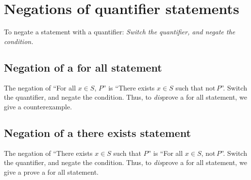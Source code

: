 \documentclass[12pt]{amsart}
\begin{document}
\section*{Negations of quantifier statements} To negate a statement with a quantifier: \emph{Switch the quantifier, and negate the condition.}

\subsection*{Negation of a for all statement} The negation of ``For all $x\in S$, $P$'' is ``There exists $x\in S$ such that $\mathrm{not} \, P$''.  Switch the quantifier, and negate the condition. Thus, to \emph{dis}prove a for all statement, we give a counterexample.

\subsection*{Negation of a there exists statement} The negation of ``There exists $x\in S$ such that $P$'' is ``For all $x\in S$, $\mathrm{not} \, P$''. Switch the quantifier, and negate the condition. Thus, to \emph{dis}prove a for all statement, we give a prove a for all statement.
\end{document}
